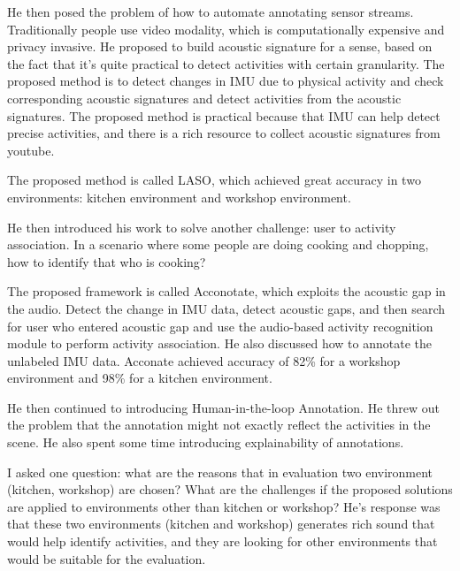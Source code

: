 \documentclass[11pt, oneside]{article}   	%
\begin{document}
He then posed the problem of how to automate annotating sensor streams. Traditionally people use video modality, which is computationally expensive and privacy invasive. He proposed to build acoustic signature for a sense, based on the fact that it's quite practical to detect activities with certain granularity.  The proposed method is to detect changes in IMU due to physical activity and check corresponding acoustic signatures and detect activities from the acoustic signatures. The proposed method is practical because that IMU can help detect precise activities, and there is a rich resource to collect acoustic signatures from youtube.

The proposed method is called LASO, which achieved great accuracy in two environments: kitchen environment and workshop environment. 

He then introduced his work to solve another challenge: user to activity association. In a scenario where some people are doing cooking and chopping, how to identify that who is cooking?

The proposed framework is called Acconotate, which exploits the acoustic gap in the audio. Detect the change in IMU data, detect acoustic gaps, and then search for user who entered acoustic gap and use the audio-based activity recognition module to perform activity association. He also discussed how to annotate the unlabeled IMU data. 
Acconate achieved accuracy of 82\% for a workshop environment and 98\% for a kitchen environment. 

He then continued to introducing Human-in-the-loop Annotation. He threw out the problem that the annotation might not exactly reflect the activities in the scene. He also spent some time introducing explainability of annotations. 

I asked one question: what are the reasons that in evaluation two environment (kitchen, workshop) are chosen? What are the challenges if the proposed solutions are applied to environments other than kitchen or workshop? He's response was that these two environments (kitchen and workshop) generates rich sound that would help identify activities, and they are looking for other environments that would be suitable for the evaluation.
\end{document}
